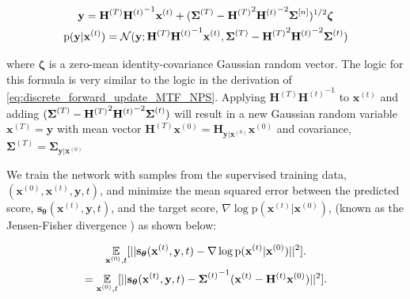 \documentclass[12pt,]{article}
\begin{document}
\begin{gather}
    \mathbf{y} = \mathbf{H}^{(T)} {\mathbf{H}^{(t)}}^{\hspace{0mm}-1} \mathbf{x}^{(t)} + (\boldsymbol{\Sigma}^{(T)} -  {\mathbf{H}^{(T)}}^{\hspace{-0mm} 2} {\mathbf{H}^{(t)}}^{\hspace{0mm}-2} \boldsymbol{\Sigma}^{[n]} )^{1/2} \boldsymbol{\zeta} \\
    \text{p}(\mathbf{y}|\mathbf{x}^{(t)})  = \mathcal{N}(\mathbf{y}; \mathbf{H}^{(T)} {\mathbf{H}^{(t)}}^{\hspace{0mm}-1} \mathbf{x}^{(t)}, \boldsymbol{\Sigma}^{(T)} -  {\mathbf{H}^{(T)}}^{\hspace{-0mm} 2} {\mathbf{H}^{(t)}}^{\hspace{0mm}-2} \boldsymbol{\Sigma}^{(t)})
    \label{eq:option_2_sample_y}
\end{gather}


\noindent where $\boldsymbol{\zeta}$ is a zero-mean identity-covariance Gaussian random vector.  The logic for this formula is very similar to the logic in the derivation of \eqref{eq:discrete_forward_update_MTF_NPS}. Applying $\mathbf{H}^{(T)}{\mathbf{H}^{(t)}}^{-1}$ to $\mathbf{x}^{(t)}$ and adding $(\boldsymbol{\Sigma}^{(T)} -  {\mathbf{H}^{(T)}}^{\hspace{-0mm} 2} {\mathbf{H}^{(t)}}^{\hspace{0mm}-2} \boldsymbol{\Sigma}^{(t)})$ will result in a new Gaussian random variable $\mathbf{x}^{(T)}=\mathbf{y}$ with mean vector $\mathbf{H}^{(T)} \mathbf{x}^{(0)} = \mathbf{H}_{\mathbf{y}|\mathbf{x}^{(0)}} \mathbf{x}^{(0)}$ and covariance, $\boldsymbol{\Sigma}^{(T)} = \boldsymbol{\Sigma}_{\mathbf{y}|\mathbf{x}^{(0)}}$

We train the network with samples from the supervised training data, $(\mathbf{x}^{(0)}, \mathbf{x}^{(t)}, \mathbf{y}, t)$, and minimize the mean squared error between the predicted score, $\mathbf{s}_{\boldsymbol{\theta}}(\mathbf{x}^{(t)}, \mathbf{y}, t)$, and the target score, $\nabla \log{\text{p} (\mathbf{x}^{(t)}|\mathbf{x}^{(0)})}$, (known as the Jensen-Fisher divergence \cite{sanchez2012jensen}) as shown below:

\begin{gather}
    \underset{\mathbf{x}^{(0)}, t}{\mathbb{E}}[||\mathbf{s}_{\boldsymbol{\theta}}(\mathbf{x}^{(t)}, \mathbf{y}, t) - \nabla \log{\text{p} (\mathbf{x}^{(t)}|\mathbf{x}^{(0)})}||^2] .
    \nonumber \\
    =\underset{\mathbf{x}^{(0)}, t}{\mathbb{E}}[||\mathbf{s}_{\boldsymbol{\theta}}(\mathbf{x}^{(t)}, \mathbf{y}, t) - {\boldsymbol{\Sigma}^{(t)}}^{\hspace{0mm}-1} (\mathbf{x}^{(t)} - \mathbf{H}^{(t)} \mathbf{x}^{(0)})   ||^2].
    \label{eq:score_matching_loss}
\end{gather}
\end{document}
